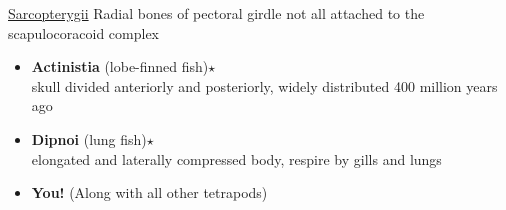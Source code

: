 \documentclass[a4paper,12pt]{article}
\begin{document}
\begin{description}
\item{\underline{{\LARGE{Sarcopterygii}}}}
Radial bones of pectoral girdle not all attached to the scapulocoracoid complex
\begin{itemize}
  \item{\textbf{Actinistia} (lobe-finned fish)$\star$} \\ skull divided anteriorly and posteriorly, widely distributed 400 million years ago
  \item{\textbf{Dipnoi} (lung fish)$\star$} \\ elongated and laterally compressed body, respire by gills and lungs
  \item{\textbf{You!} (Along with all other tetrapods)}
\end{itemize}
\end{description}
\end{document}
